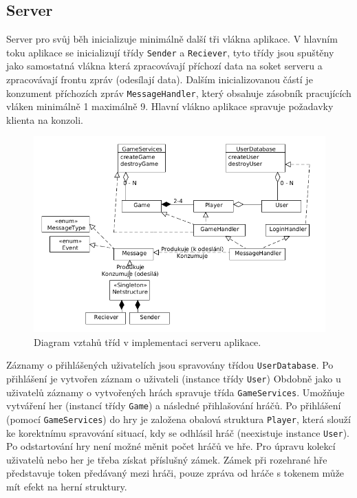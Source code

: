 \documentclass[12pt, a4paper]{article}
\begin{document}
\subsection{Server}

Server pro svůj běh inicializuje minimálně další tři vlákna aplikace. V hlavním toku aplikace se inicializují třídy \texttt{Sender} a \texttt{Reciever}, tyto třídy jsou spuštěny jako samostatná vlákna která zpracovávají příchozí data na soket serveru a zpracovávají frontu zpráv (odesílají data). Dalším inicializovanou částí je konzument příchozích zpráv \texttt{MessageHandler}, který obsahuje zásobník pracujících vláken minimálně 1 maximálně 9. Hlavní vlákno aplikace spravuje požadavky klienta na konzoli.

\begin{figure}[ht]
\centering
\includegraphics[bb= 0 0 730 490 , width=12cm]{server.png}
\caption{Diagram vztahů tříd v implementaci serveru aplikace.}
\label{fig:game}
\end{figure}

Záznamy o přihlášených uživatelích jsou spravovány třídou \texttt{UserDatabase}. Po přihlášení je vytvořen záznam o uživateli (instance třídy \texttt{User}) Obdobně jako u uživatelů záznamy o vytvořených hrách spravuje třída \texttt{GameServices}. Umožňuje vytváření her (instancí třídy \texttt{Game}) a následné přihlašování hráčů. Po přihlášení (pomocí \texttt{GameServices}) do hry je založena obalová struktura \texttt{Player}, která slouží ke korektnímu spravování situací, kdy se odhlásil hráč (neexistuje instance \texttt{User}). Po odstartování hry není možné měnit počet hráčů ve hře. Pro úpravu kolekcí uživatelů nebo her je třeba získat příslušný zámek. Zámek při rozehrané hře představuje token předávaný mezi hráči, pouze zpráva od hráče s tokenem může mít efekt na herní struktury.
\end{document}
